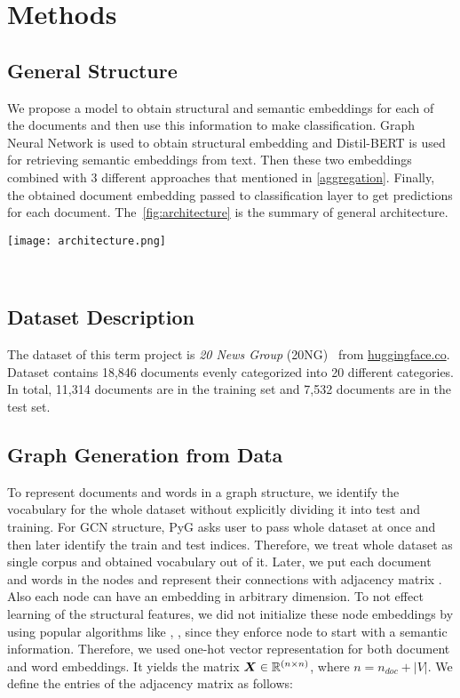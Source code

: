 \section{Methods}\label{sec:methods}
\subsection{General Structure}
We propose a model to obtain structural and semantic embeddings for each of the documents and then use this information to make classification. Graph Neural Network is used to obtain structural embedding and Distil-BERT is used for retrieving semantic embeddings from text. Then these two embeddings combined with 3 different approaches that mentioned in \cref{aggregation}. Finally, the obtained document embedding passed to classification layer to get predictions for each document. The~\cref{fig:architecture} is the summary of general architecture. 
\begin{figure*}[ht]
    \centering{}
    \texttt{[image: architecture.png]}
    \caption{Model Architecture}~\label{fig:architecture}
\end{figure*}

\subsection{Dataset Description}
The dataset of this term project is \emph{20 News Group} (20NG)~\autocite{20newsgroup} from \href{https://huggingface.co/datasets/SetFit/20_newsgroups}{huggingface.co}. Dataset contains 18,846 documents evenly categorized into 20 different categories. In total, 11,314 documents are in the training set and 7,532 documents are in the test set.

\subsection{Graph Generation from Data}
To represent documents and words in a graph structure, we identify the vocabulary for the whole dataset without explicitly dividing it into test and training. For GCN structure, PyG asks user to pass whole dataset at once and then later identify the train and test indices. Therefore, we treat whole dataset as single corpus and obtained vocabulary out of it. Later, we put each document and words in the nodes and represent their connections with adjacency matrix . Also each node can have an embedding in arbitrary dimension. To not effect learning of the structural features, we did not initialize these node embeddings by using popular algorithms like \cite{pennington-etal-2014-glove}, \cite{word2vec}, since they enforce node to start with a semantic information. Therefore, we used one-hot vector representation for both document and word embeddings. It yields the matrix $\boldsymbol{X} \in \mathbb{R}^{(n \times n)}$, where $n = n_{doc} + |V|$. We define the entries of the adjacency matrix as follows:
    
